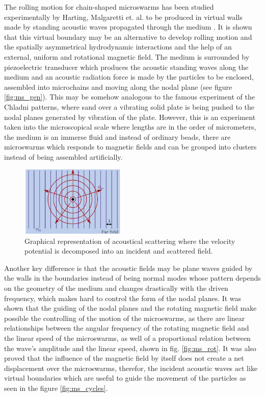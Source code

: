 The rolling motion for chain-shaped microswarms has been studied experimentally by Harting, Malgaretti et. al. to be produced in virtual walls made by standing acoustic waves propagated through the medium \cite{paper_rods}. It is shown that this virtual boundary may be an alternative to develop rolling motion and the spatially asymmetrical hydrodynamic interactions and the help of an external, uniform and rotational magnetic field. The medium is surrounded by piezoelectric transducer which produces the acoustic standing waves along the medium and an acoustic radiation force is made by the particles to be enclosed, assembled into microchains and moving along the nodal plane (see figure \ref{fig:ms_gen}). This may be somehow analogous to the famous experiment of the Chladni patterns, where sand over a vibrating solid plate is being pushed to the nodal planes generated by vibration of the plate. However, this is an experiment taken into the microscopical scale where lengths are in the order of micrometers, the medium is an immerse fluid and instead of ordinary beads, there are microswarms which responds to magnetic fields and can be grouped into clusters instead of being assembled artificially. 
\begin{figure}[t]
    \centering
    \includegraphics[width=0.45\textwidth]{images/intro/Scattering.PNG}
    \caption{Graphical representation of acoustical scattering where the velocity potential is decomposed into an incident and scattered field.}
    \label{fig:sc_scheme}
\end{figure}
Another key difference is that the acoustic fields may be plane waves guided by the walls in the boundaries instead of being normal modes whose pattern depends on the geometry of the medium and changes drastically with the driven frequency, which makes hard to control the form of the nodal planes. It was shown that the guiding of the nodal planes and the rotating magnetic field make possible the controlling of the motion of the microswarms, as there are linear relationships between the angular frequency of the rotating magnetic field and the linear speed of the microswarms, as well of a proportional relation between the wave's amplitude and the linear speed, shown in fig. \ref{fig:ms_rot}. It was also proved that the influence of the magnetic field by itself does not create a net displacement over the microswarms, therefor, the incident acoustic waves act like virtual boundaries which are useful to guide the movement of the particles as seen in the figure \ref{fig:ms_cycles}. 